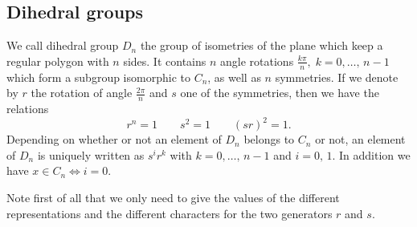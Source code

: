 \subsection{Dihedral groups}
 
 
 
\begin{defn}
  We call dihedral group $ D_n $ the group of isometries of the plane which keep a regular polygon with $ n $ sides. It contains $ n $ angle rotations $ \frac{k \pi}{n}, \; k = 0, \ldots, \, n-1 $ which form a subgroup isomorphic to $ C_n $, as well as $ n $ symmetries. If we denote by $ r $ the rotation of angle $ \frac{2 \pi}{n} $ and $ s $ one of the symmetries, then we have the relations
\begin{equation*}
r^n = 1 \quad \quad s^2 = 1 \quad \quad (sr)^2 = 1.
\end{equation*}
Depending on whether or not an element of $ D_n $ belongs to $ C_n $ or not, an element of $ D_n $ is uniquely written as $ s^ir^k $ with $ k = 0, \ldots, \, n-1 $ and $ i = 0, \, 1 $. In addition we have $ x \in C_n \Leftrightarrow i = 0 $.
\end{defn}
 
 
 
Note first of all that we only need to give the values of the different representations and the different characters for the two generators $ r $ and $ s $.
 
